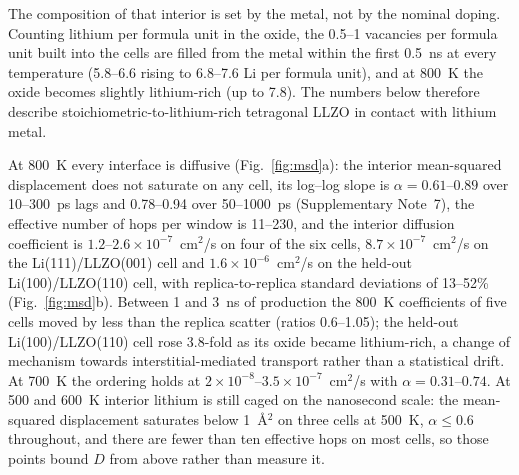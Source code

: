 \documentclass[11pt]{article}
\begin{document}
The composition of that interior is set by the metal, not by the nominal
doping. Counting lithium per formula unit in the oxide, the 0.5--1 vacancies
per formula unit built into the cells are filled from the metal within the
first 0.5~ns at every temperature (5.8--6.6 rising to 6.8--7.6 Li per formula
unit), and at 800~K the oxide becomes slightly lithium-rich (up to 7.8). The
numbers below therefore describe stoichiometric-to-lithium-rich tetragonal LLZO
in contact with lithium metal.

At 800~K every interface is diffusive (Fig.~\ref{fig:msd}a): the interior
mean-squared displacement does not saturate on any cell, its log--log slope is
$\alpha=0.61$--$0.89$ over 10--300~ps lags and 0.78--0.94 over 50--1000~ps
(Supplementary Note~7), the effective number of hops per window\citep{He2018}
is 11--230, and the interior diffusion coefficient is
$1.2$--$2.6\times10^{-7}$~cm$^2$/s on four of the six cells,
$8.7\times10^{-7}$~cm$^2$/s on the Li(111)/LLZO(001) cell and
$1.6\times10^{-6}$~cm$^2$/s on the held-out Li(100)/LLZO(110) cell, with
replica-to-replica standard deviations of 13--52\% (Fig.~\ref{fig:msd}b).
Between 1 and 3~ns of production the 800~K coefficients of five cells moved by
less than the replica scatter (ratios 0.6--1.05); the held-out Li(100)/LLZO(110)
cell rose 3.8-fold as its oxide became lithium-rich, a change of mechanism
towards interstitial-mediated transport rather than a statistical drift. At
700~K the ordering holds at $2\times10^{-8}$--$3.5\times10^{-7}$~cm$^2$/s with
$\alpha=0.31$--$0.74$. At 500 and 600~K interior lithium is still caged on the
nanosecond scale: the mean-squared displacement saturates below 1~\AA$^2$ on
three cells at 500~K, $\alpha\leq0.6$ throughout, and there are fewer than ten
effective hops on most cells, so those points bound $D$ from above rather than
measure it.
\end{document}
